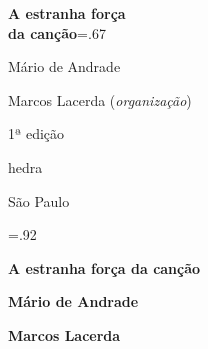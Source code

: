 




\begingroup\thispagestyle{empty}\vspace*{-.01\textheight}\parindent=0pt 
              \formular
              \Huge 
              \textbf{A estranha força\\ da canção}\baselineskip=.67\baselineskip 

              \smaller[3]\textit{}
              \vspace{15mm}
              
              \LARGE
              Mário de Andrade
              
              \vspace{5cm}

              \newfontfamily{}
              {\selectfont\minion\small Marcos Lacerda (\textit{organização})}
              
              {\selectfont\minion\footnotesize
              1ª edição}
                    
              \vfill

              \newfontfamily{}
              {\fontsize{30}{40}\selectfont \timesnewroman hedra}
              
              \medskip

              {\selectfont\minion\small
              São Paulo \quad\the\year}
\endgroup
\pagebreak

\begingroup 

\footnotesize\parindent0pt\parskip5pt\thispagestyle{empty} 
\vspace*{.1\textheight}\mbox{} \vfill
\baselineskip=.92\baselineskip
\thispagestyle{empty}

\textbf{A estranha força da canção} \lipsum[1]

\textbf{Mário de Andrade} \lipsum[2]

\textbf{Marcos Lacerda} \lipsum[3]


\endgroup
\pagebreak
